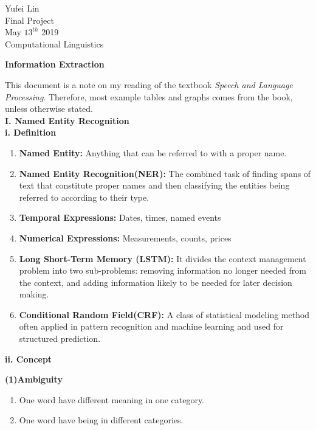 \documentclass[a4paper,12pt]{report}
\begin{document}
\noindent
Yufei Lin\\

\noindent
Final Project\\

\noindent
May \(13^{th}\) 2019\\

\noindent
Computational Linguistics

\begin{center}
\textbf{Information Extraction} 
\end{center}

\noindent
This document is a note on my reading of the textbook \textit{Speech and Language Processing}. Therefore, most example tables and graphs comes from the book, unless otherwise stated.\\

\noindent
\textbf{I. Named Entity Recognition}\\

\noindent
\textbf{i. Definition}

\begin{enumerate}
\item \textbf{Named Entity:} Anything that can be referred to with a proper name.
\item \textbf{Named Entity Recognition(NER):} The combined task of finding spans of text that constitute proper names and then classifying the entities being referred to according to their type. 
\item \textbf{Temporal Expressions:} Dates, times, named events
\item \textbf{Numerical Expressions:} Measurements, counts, prices
\item \textbf{Long Short-Term Memory (LSTM):} It divides the context management problem into two sub-problems: removing information no longer needed from the context, and adding information likely to be needed for later decision making.
\item \textbf{Conditional Random Field(CRF):} A class of statistical modeling method often applied in pattern recognition and machine learning and used for structured prediction.
\end{enumerate}

\noindent
\textbf{ii. Concept}

\noindent
\textbf{(1)Ambiguity}
\begin{enumerate}
\item One word have different meaning in one category.
\item One word have being in different categories. 
\end{enumerate}
\end{document}
